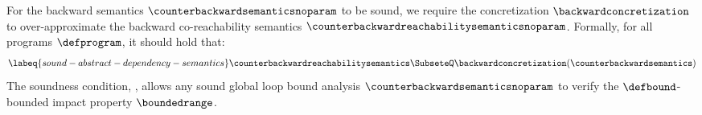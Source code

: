%
For the backward semantics $\counterbackwardsemanticsnoparam$ to be sound, we require the concretization $\backwardconcretization$ to over-approximate the backward co-reachability semantics $\counterbackwardreachabilitysemanticsnoparam$.
Formally, for all programs $\defprogram$, it should hold that:
\begin{equation}
  \labeq{sound-abstract-dependency-semantics}
  \counterbackwardreachabilitysemantics\SubseteQ\backwardconcretization(\counterbackwardsemantics)
\end{equation}
%
The soundness condition, \cf{} , allows any sound global loop bound analysis $\counterbackwardsemanticsnoparam$ to verify the $\defbound$-bounded impact property $\boundedrange$.


